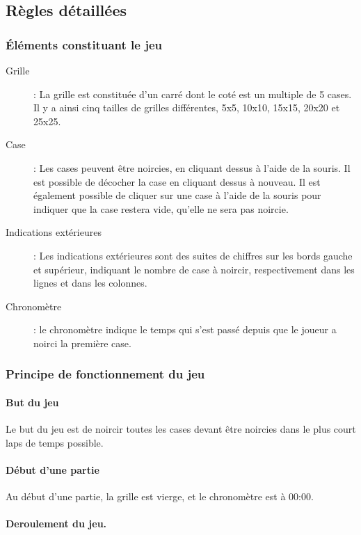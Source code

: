 \documentclass[11pt]{article}
\begin{document}
\subsection{Règles détaillées}

\subsubsection{Éléments constituant le jeu}

    \begin{description}
        \item[Grille] : La grille est constituée d'un carré dont le coté est un multiple de 5 cases. Il y a ainsi cinq tailles de grilles différentes, 5x5, 10x10, 15x15, 20x20 et 25x25.
        \item[Case] : Les cases peuvent être noircies, en cliquant dessus à l'aide de la souris. Il est possible de décocher la case en cliquant dessus à nouveau. Il est également possible de cliquer sur une case à l'aide de la souris pour indiquer que la case restera vide, qu'elle ne sera pas noircie.
        \item[Indications extérieures] : Les indications extérieures sont des suites de chiffres sur les bords gauche et supérieur, indiquant le nombre de case à noircir, respectivement dans les lignes et dans les colonnes.
        \item[Chronomètre] : le chronomètre indique le temps qui s'est passé depuis que le joueur a noirci la première case.
    \end{description}

\subsubsection{Principe de fonctionnement du jeu}

\paragraph{But du jeu}
Le but du jeu est de noircir toutes les cases devant être noircies dans le plus court laps de temps possible.

\paragraph{Début d'une partie}

Au début d'une partie, la grille est vierge, et le chronomètre est à 00:00.
\paragraph{Deroulement du jeu.}
\end{document}
